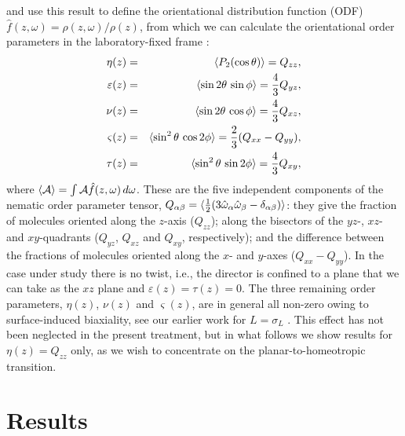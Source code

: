 \documentclass[aps,pre,twocolumn,groupedaddress,showpacs]{revtex4}
\begin{document}
and use this result to define the orientational distribution function 
(ODF) $\hat f(z,\omega)=\rho(z,\omega)/\rho(z)$, from which we can
calculate the orientational order parameters in the laboratory-fixed
frame \cite{MTG:1984}:
\begin{eqnarray}
\label{eq:eta}
\eta(z)&=&\langle P_2(\cos\theta )\rangle = Q_{zz}, \\
\label{eq:epsilon}
\varepsilon(z)&=&\langle\sin 2\theta\,\sin \phi \rangle 
={4\over 3}Q_{yz},\\
\label{eq:nu}   
\nu(z)&=&\langle \sin 2\theta\,\cos\phi \rangle = {4\over 3}Q_{xz}, \\
\label{eq:sigma}
\varsigma(z)&=&\langle \sin^2\theta\,\cos 2\phi \rangle =
{2\over 3}(Q_{xx}-Q_{yy}), \\
\label{eq:tau}
\tau(z)&=&\langle \sin^2\theta\,\sin2\phi \rangle = {4\over 3}Q_{xy},
\end{eqnarray}
where $\langle {\cal A}\rangle =\int {\cal A}\hat f(z,\omega)\,d\omega$.
These are the five independent components of the nematic order
parameter tensor, $Q_{\alpha\beta}=\langle {1\over
2}(3\hat\omega_\alpha\hat\omega_\beta-\delta_{\alpha\beta})\rangle$: they
give the fraction of molecules oriented along the $z$-axis ($Q_{zz}$); along 
the bisectors of the $yz$-, $xz$- and $xy$-quadrants ($Q_{yz}$, $Q_{xz}$ and
$Q_{xy}$, respectively); and the difference between the fractions of molecules
oriented along the $x$- and $y$-axes ($Q_{xx}-Q_{yy}$). 
In the case under study there is no twist, i.e., the director is confined 
to a plane that we can take as the $xz$ plane and $\varepsilon(z)=\tau(z)=0$. 
The three remaining order parameters, $\eta(z)$, $\nu(z)$ and $\varsigma(z)$, 
are in general all non-zero owing to surface-induced biaxiality, see our 
earlier work for $L=\sigma_L$ \cite{Chrzanowska:2001}. This effect has not 
been neglected in the present treatment, but in what follows we show results 
for $\eta(z)=Q_{zz}$ only, as we wish to concentrate on the 
planar-to-homeotropic transition.



\section{Results}

\label{sect-results}
\end{document}
